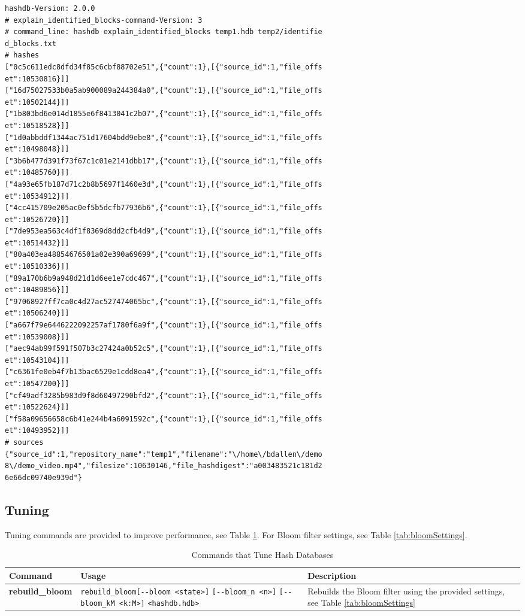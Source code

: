 \documentclass[11pt,fleqn]{article} %
\begin{document}
\begin{lstlisting}[float, caption={The \texttt{identified\_hashes\_and\_sources.txt} file produced by post-processing the \texttt{identified\_blocks.txt} file using the \texttt{explain\_identified\_blocks} command}, label=explainHashesAndSources]
 hashdb-Version: 2.0.0
# explain_identified_blocks-command-Version: 3
# command_line: hashdb explain_identified_blocks temp1.hdb temp2/identifie
d_blocks.txt
# hashes
["0c5c611edc8dfd34f85c6cbf88702e51",{"count":1},[{"source_id":1,"file_offs
et":10530816}]]
["16d75027533b0a5ab900089a244384a0",{"count":1},[{"source_id":1,"file_offs
et":10502144}]]
["1b803bd6e014d1855e6f8413041c2b07",{"count":1},[{"source_id":1,"file_offs
et":10518528}]]
["1d0abbddf1344ac751d17604bdd9ebe8",{"count":1},[{"source_id":1,"file_offs
et":10498048}]]
["3b6b477d391f73f67c1c01e2141dbb17",{"count":1},[{"source_id":1,"file_offs
et":10485760}]]
["4a93e65fb187d71c2b8b5697f1460e3d",{"count":1},[{"source_id":1,"file_offs
et":10534912}]]
["4cc415709e205ac0ef5b5dcfb77936b6",{"count":1},[{"source_id":1,"file_offs
et":10526720}]]
["7de953ea563c4df1f8369d8dd2cfb4d9",{"count":1},[{"source_id":1,"file_offs
et":10514432}]]
["80a403ea48854676501a02e390a69699",{"count":1},[{"source_id":1,"file_offs
et":10510336}]]
["89a170b6b9a948d21d1d6ee1e7cdc467",{"count":1},[{"source_id":1,"file_offs
et":10489856}]]
["97068927ff7ca0c4d27ac527474065bc",{"count":1},[{"source_id":1,"file_offs
et":10506240}]]
["a667f79e6446222092257af1780f6a9f",{"count":1},[{"source_id":1,"file_offs
et":10539008}]]
["aec94ab99f591f507b3c27424a0b52c5",{"count":1},[{"source_id":1,"file_offs
et":10543104}]]
["c6361fe0eb4f7b13bac6529e1cdd8ea4",{"count":1},[{"source_id":1,"file_offs
et":10547200}]]
["cf49adf3285b983d9f8d60497290bfd2",{"count":1},[{"source_id":1,"file_offs
et":10522624}]]
["f58a09656658c6b41e244b4a6091592c",{"count":1},[{"source_id":1,"file_offs
et":10493952}]]
# sources
{"source_id":1,"repository_name":"temp1","filename":"\/home\/bdallen\/demo
8\/demo_video.mp4","filesize":10630146,"file_hashdigest":"a003483521c181d2
6e66dc09740e939d"}
\end{lstlisting}

\subsection{Tuning}
Tuning commands are provided to improve performance,
see Table \ref{tab:tuning}.
For Bloom filter settings, see Table \ref{tab:bloomSettings}.

\begin{table}[!ht]
\centering
\caption{Commands that Tune Hash Databases}
\label{tab:tuning}
\begin{tabular}{|p{3.5 cm}|p{6 cm}|p{4 cm}|}
\hline \hline
\textbf{Command} & \textbf{Usage} & \textbf{Description} \\
\hline
\textbf{rebuild\_bloom} & \verb+rebuild_bloom[--bloom <state>]+ \verb+[--bloom_n <n>]+ \verb+[--bloom_kM <k:M>]+ \verb+<hashdb.hdb>+ & Rebuilds the Bloom filter using the provided settings, see Table \ref{tab:bloomSettings}\\
\hline
\end{tabular}
\end{table}
\end{document}
